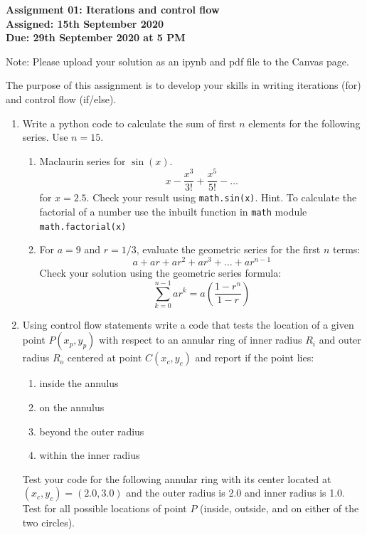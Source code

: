 \documentclass[a4paper,12pt]{article}
\begin{document}
\begin{centering}
	\textbf{
		Assignment 01: Iterations and control flow\\
		Assigned: 15th September 2020\\
		Due: 29th September 2020 at 5 PM\\
	}
\end{centering}


Note: Please upload your solution as an ipynb and pdf file to the Canvas page.

\vspace{1em}
 
 The purpose of this assignment is to develop your skills in writing iterations (for) and control flow (if/else).
 
\begin{enumerate}
	\item Write a python code to calculate the sum of first $n$ elements for the following series. Use $n = 15$.
	\begin{enumerate}
		\item Maclaurin series for $\sin(x)$. 
		\begin{equation*}
		x - \frac{x^3}{3!} + \frac{x^5}{5!} - \dots
		\end{equation*}
		for $x = 2.5$. Check your result using \verb|math.sin(x)|.	Hint. To calculate the factorial of a number use the inbuilt function in \verb|math| module \verb|math.factorial(x)|
		\item For $a = 9$ and $r = 1/3$, evaluate the geometric series for the first $n$ terms:
		\begin{equation*}
		a + ar + ar^2 + ar^3 + \dots + ar^{n - 1}
		\end{equation*}
		Check your solution using the geometric series formula:
		\begin{equation*}
			\sum_{k = 0}^{n - 1} ar^k = a \left(\frac{1 -r^n}{1-r}\right)
		\end{equation*}
		
	\end{enumerate}


	
	\item Using control flow  statements write a code that tests the location of a given point $P(x_p, y_p)$ with respect to an annular ring of inner radius $R_i$ and outer radius $R_o$ centered at point $C (x_c, y_c)$ and report if the point lies:
	\begin{enumerate}
		\item inside the annulus
		\item on the annulus
		\item beyond the outer radius
		\item within the inner radius
	\end{enumerate}
	 Test your code for the following annular ring with its center located at $(x_c, y_c) = (2.0, 3.0)$ and the outer radius is 2.0 and inner radius is 1.0. Test for all possible locations of point $P$ (inside, outside, and on either
	 of the two circles).
	 

\end{enumerate}
\end{document}
